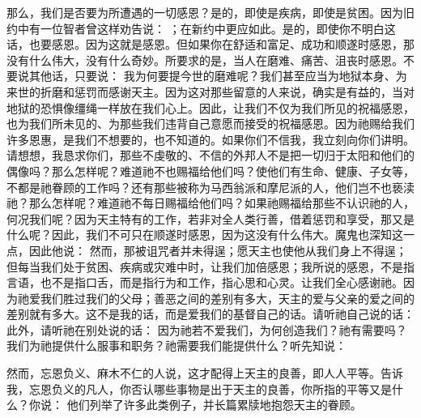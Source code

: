 那么，我们是否要为所遭遇的一切感恩？是的，即使是疾病，即使是贫困。因为旧约中有一位智者曾这样劝告说： ；在新约中更应如此。是的，即使你不明白这话，也要感恩。因为这就是感恩。但如果你在舒适和富足、成功和顺遂时感恩，那没有什么伟大，没有什么奇妙。所要求的是，当人在磨难、痛苦、沮丧时感恩。不要说其他话，只要说： 我为何要提今世的磨难呢？我们甚至应当为地狱本身、为来世的折磨和惩罚而感谢天主。因为这对那些留意的人来说，确实是有益的，当对地狱的恐惧像缰绳一样放在我们心上。因此，让我们不仅为我们所见的祝福感恩，也为我们所未见的、为那些我们违背自己意愿而接受的祝福感恩。因为祂赐给我们许多恩惠，是我们不想要的，也不知道的。如果你们不信我，我立刻向你们讲明。请想想，我恳求你们，那些不虔敬的、不信的外邦人不是把一切归于太阳和他们的偶像吗？那么怎样呢？难道祂不也赐福给他们吗？使他们有生命、健康、子女等，不都是祂眷顾的工作吗？还有那些被称为马西翁派和摩尼派的人，他们岂不也亵渎祂？那么怎样呢？难道祂不每日赐福给他们吗？如果祂赐福给那些不认识祂的人，何况我们呢？因为天主特有的工作，若非对全人类行善，借着惩罚和享受，那又是什么呢？因此，我们不可只在顺遂时感恩，因为这没有什么伟大。魔鬼也深知这一点，因此他说：  然而，那被诅咒者并未得逞；愿天主也使他从我们身上不得逞；但每当我们处于贫困、疾病或灾难中时，让我们加倍感恩；我所说的感恩，不是指言语，也不是指口舌，而是指行为和工作，指心思和心灵。让我们全心感谢祂。因为祂爱我们胜过我们的父母；善恶之间的差别有多大，天主的爱与父亲的爱之间的差别就有多大。这不是我的话，而是爱我们的基督自己的话。请听祂自己说的话：  此外，请听祂在别处说的话：  因为祂若不爱我们，为何创造我们？祂有需要吗？我们为祂提供什么服事和职务？祂需要我们能提供什么？听先知说： \par

然而，忘恩负义、麻木不仁的人说，这才配得上天主的良善，即人人平等。告诉我，忘恩负义的凡人，你否认哪些事物是出于天主的良善，你所指的平等又是什么？你说： 他们列举了许多此类例子，并长篇累牍地抱怨天主的眷顾。\par

